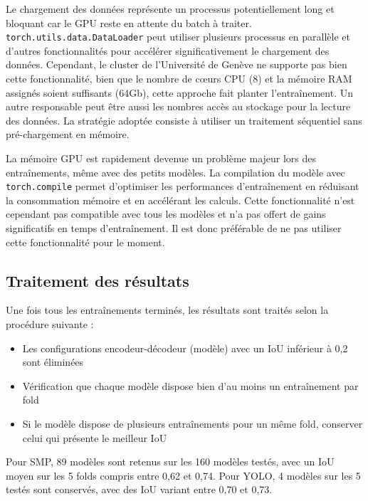 Le chargement des données représente un processus potentiellement long et bloquant car le GPU reste en attente du batch à traiter. \texttt{torch.utils.data.DataLoader} peut utiliser plusieurs processus en parallèle et d'autres fonctionnalités pour accélérer significativement le chargement des données. Cependant, le cluster de l'Université de Genève ne supporte pas bien cette fonctionnalité, bien que le nombre de cœurs CPU (8) et la mémoire RAM assignés soient suffisants (64Gb), cette approche fait planter l'entraînement. Un autre responsable peut être aussi les nombres accès au stockage pour la lecture des données. La stratégie adoptée consiste à utiliser un traitement séquentiel sans pré-chargement en mémoire.

La mémoire GPU est rapidement devenue un problème majeur lors des entraînements, même avec des petits modèles. La compilation du modèle avec \texttt{torch.compile} permet d'optimiser les performances d'entraînement en réduisant la consommation mémoire et en accélérant les calculs. Cette fonctionnalité n'est cependant pas compatible avec tous les modèles et n'a pas offert de gains significatifs en temps d'entraînement. Il est donc préférable de ne pas utiliser cette fonctionnalité pour le moment.

\subsection{Traitement des résultats}
Une fois tous les entraînements terminés, les résultats sont traités selon la procédure suivante :
\begin{itemize}
    \item Les configurations encodeur-décodeur (modèle) avec un IoU inférieur à 0,2 sont éliminées
    \item Vérification que chaque modèle dispose bien d'au moins un entraînement par fold
    \item Si le modèle dispose de plusieurs entraînements pour un même fold, conserver celui qui présente le meilleur IoU
\end{itemize}

Pour SMP, 89 modèles sont retenus sur les 160 modèles testés, avec un IoU moyen sur les 5 folds compris entre 0,62 et 0,74. Pour YOLO, 4 modèles sur les 5 testés sont conservés, avec des IoU variant entre 0,70 et 0,73.

\newpage
